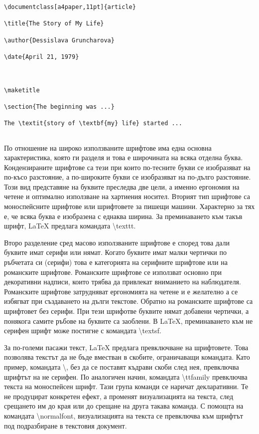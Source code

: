 \begin{lstlisting}[language={[LaTeX]TeX}, caption=Вложено оформление, label=listing-0008]
\documentclass[a4paper,11pt]{article}

\title{The Story of My Life}

\author{Dessislava Gruncharova}

\date{April 21, 1979}



\maketitle

\section{The beginning was ...}

The \textit{story of \textbf{my} life} started ...


\end{lstlisting}

По отношение на широко използваните шрифтове има една основна характеристика, която ги разделя и това е широчината на всяка отделна буква. Кондензираните шрифтове са тези при които по-тесните букви се изобразяват на по-късо разстояние, а по-широките букви се изобразяват на по-дълго разстояние. Този вид представяне на буквите преследва две цели, а именно ергономия на четене и оптимално използване на хартиения носител. Вторият тип шрифтове са моноспейсните шрифтове или шрифтовете за пишещи машини. Характерно за тях е, че всяка буква е изобразена с еднаква ширина. За преминаването към такъв шрифт, LaTeX предлага командата \textbackslash texttt. 

Второ разделение сред масово използваните шрифтове е според това дали буквите имат серифи или нямат. Когато буквите имат малки чертички по ръбчетата си (серифи) това е категорията на серифните шрифтове или на романските шрифтове. Романските шрифтове се използват основно при декоративни надписи, които трябва да привлекат вниманието на наблюдателя. Романските шрифтове затрудняват ергономията на четене и е желателно а се избягват при създаването на дълги текстове. Обратно на романските шрифтове са шрифтовет без серифи. При тези шрифотве буквите нямат добавени чертички, а понякога самите ръбове на буквите са заоблени. В LaTeX, преминаването към не серифен шрифт може постигне с командата \textbackslash textsf. 

За по-големи пасажи текст, LaTeX предлага превключване на шрифтовете. Това позволява текстът да не бъде вместван в скобите, ограничаващи командата. Като пример, командата \textbackslash \sffamily, без да се поставят къдрави скоби след нея, превключва шрифтът на не серифен. По аналогичен начин, командата \textbackslash ttfamily превключва текста на моноспейсен шрифт. Тази група команди се наричат декларативни. Те не продуцират конкретен ефект, а променят визуализацията на текста, след срещането им до края или до срещане на друга такава команда. С помощта на командата \textbackslash normalfont, визуализацията на текста се превключва към шрифтът под подразбиране в текстовия документ.

